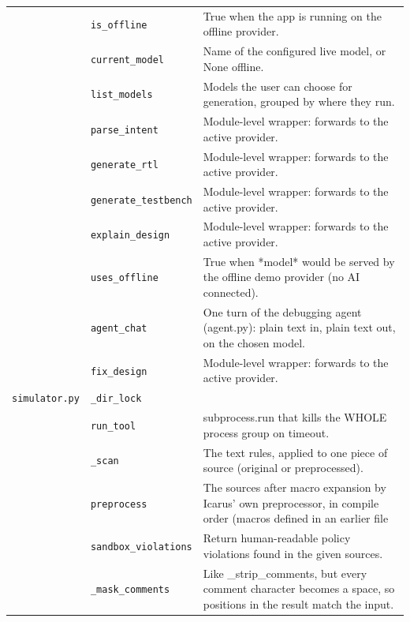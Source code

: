 \begin{longtable}{@{}p{2.8cm}>{\raggedright\arraybackslash}p{4.6cm}p{7.9cm}@{}}
{\small } & \texttt{\small is\_\allowbreak{}offline} & True when the app is running on the offline provider. \\
{\small } & \texttt{\small current\_\allowbreak{}model} & Name of the configured live model, or None offline. \\
{\small } & \texttt{\small list\_\allowbreak{}models} & Models the user can choose for generation, grouped by where they run. \\
{\small } & \texttt{\small parse\_\allowbreak{}intent} & Module-level wrapper: forwards to the active provider. \\
{\small } & \texttt{\small generate\_\allowbreak{}rtl} & Module-level wrapper: forwards to the active provider. \\
{\small } & \texttt{\small generate\_\allowbreak{}testbench} & Module-level wrapper: forwards to the active provider. \\
{\small } & \texttt{\small explain\_\allowbreak{}design} & Module-level wrapper: forwards to the active provider. \\
{\small } & \texttt{\small uses\_\allowbreak{}offline} & True when *model* would be served by the offline demo provider (no AI connected). \\
{\small } & \texttt{\small agent\_\allowbreak{}chat} & One turn of the debugging agent (agent.py): plain text in, plain text out, on the chosen model. \\
{\small } & \texttt{\small fix\_\allowbreak{}design} & Module-level wrapper: forwards to the active provider. \\
{\small \nolinkurl{simulator.py}} & \texttt{\small \_\allowbreak{}dir\_\allowbreak{}lock} &  \\
{\small } & \texttt{\small run\_\allowbreak{}tool} & subprocess.run that kills the WHOLE process group on timeout. \\
{\small } & \texttt{\small \_\allowbreak{}scan} & The text rules, applied to one piece of source (original or preprocessed). \\
{\small } & \texttt{\small preprocess} & The sources after macro expansion by Icarus' own preprocessor, in compile order (macros defined in an earlier file \\
{\small } & \texttt{\small sandbox\_\allowbreak{}violations} & Return human-readable policy violations found in the given sources. \\
{\small } & \texttt{\small \_\allowbreak{}mask\_\allowbreak{}comments} & Like \_strip\_comments, but every comment character becomes a space, so positions in the result match the input. \\

\end{longtable}
